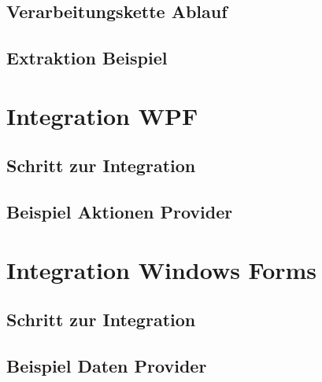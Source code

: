 \subsection{Verarbeitungskette Ablauf}

\subsection{Extraktion Beispiel}

\section{Integration WPF}
\label{sec:integration_wpf_impl}

\subsection{Schritt zur Integration}

\subsection{Beispiel Aktionen Provider}

\section{Integration Windows Forms}
\label{sec:integration_winforms_impl}

\subsection{Schritt zur Integration}

\subsection{Beispiel Daten Provider}

